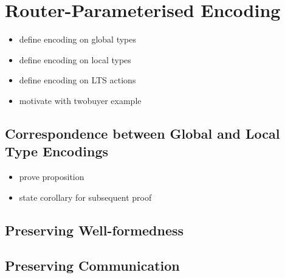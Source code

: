 \section{Router-Parameterised Encoding}
\label{section:encoding}

\begin{itemize}
\item define encoding on global types
\item define encoding on local types
\item define encoding on LTS actions
\item motivate with twobuyer example
\end{itemize}

\subsection{Correspondence between Global and Local Type Encodings}
\begin{itemize}
\item prove proposition
\item state corollary for subsequent proof
\end{itemize}

\subsection{Preserving Well-formedness}

\subsection{Preserving Communication}